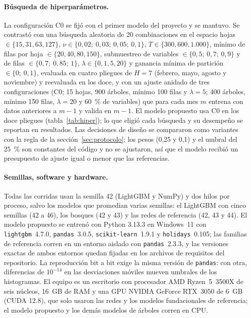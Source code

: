 \paragraph{Búsqueda de hiperparámetros.}
La configuración C0 se fijó con el primer modelo del proyecto y se mantuvo. Se contrastó con una búsqueda
aleatoria de 20 combinaciones en el espacio hojas $\in \{15, 31, 63, 127\}$,
$\nu \in \{0{,}02;\ 0{,}03;\ 0{,}05;\ 0{,}1\}$, $T \in \{300, 600, 1.000\}$, mínimo de filas por hoja
$\in \{20, 40, 80, 150\}$, submuestreo de variables $\in \{0{,}5;\ 0{,}7;\ 0{,}9\}$ y de filas
$\in \{0{,}7;\ 0{,}85;\ 1\}$, $\lambda \in \{0, 1, 5, 20\}$ y ganancia mínima de partición $\in \{0;\ 0{,}1\}$,
evaluada en cuatro pliegues de $H = 7$ (febrero, mayo, agosto y noviembre) y reevaluada en los doce, y con un
ajuste anidado de tres configuraciones (C0; 15 hojas, 900 árboles, mínimo 100 filas y $\lambda = 5$; 400
árboles, mínimo 150 filas, $\lambda = 20$ y 60~\% de variables) que para cada mes $m$ entrena con datos
anteriores a $m - 1$ y valida en $m - 1$. El modelo propuesto usa C0 en los doce pliegues
(tabla~\ref{tab:hiper}); lo que eligió cada búsqueda y su desempeño se reportan en resultados. Las
decisiones de diseño se
compararon como variantes con la regla de la sección~\ref{sec:protocolo}; los pesos (0,25 y 0,1) y el
umbral del 25~\% son constantes del código y no se ajustaron, así que el modelo recibió un presupuesto de
ajuste igual o menor que las referencias.

\paragraph{Semillas, software y hardware.}
Todas las corridas usan la semilla 42 (LightGBM y NumPy) y dos hilos por proceso, salvo los modelos que
promedian varias semillas: el LightGBM con cinco semillas (42 a 46), los bosques (42 y 43) y las redes de
referencia (42, 43 y 44). El modelo propuesto se entrenó con Python 3.13.3 en Windows~11 con
\texttt{lightgbm}~4.7.0, \texttt{pandas}~3.0.5, \texttt{scikit-learn}~1.9.1 y \texttt{holidays}~0.105; las
familias de referencia corren en un entorno aislado con \texttt{pandas}~2.3.3, y las versiones exactas de
ambos entornos quedan fijadas en los archivos de requisitos del repositorio. La reproducción bit a bit exige
la misma versión de \texttt{pandas}: con otra, diferencias de $10^{-14}$ en las desviaciones móviles mueven
umbrales de los histogramas. El equipo es un escritorio con procesador AMD Ryzen~5~3500X de seis núcleos,
16~GB de RAM y una GPU NVIDIA GeForce RTX~3050 de 6~GB (CUDA 12.8), que solo usaron las redes y los modelos
fundacionales de referencia; el modelo propuesto y los demás modelos de árboles corren en CPU.


